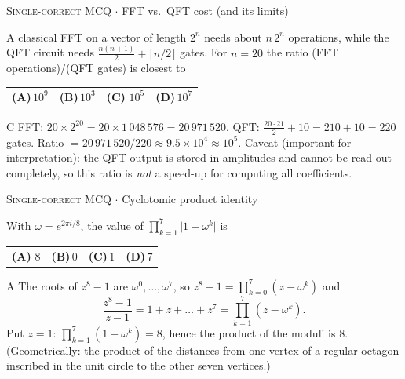 \documentclass[11pt,a4paper]{article}
\newcommand{\optlabel}[1]{\textbf{(#1)}}
\newcommand{\correctlabel}[1]{\textcolor{okgreen}{\textbf{(#1)}\,\ding{51}}}
\newenvironment{qitem}[1]{\begin{list}{}{\setlength{\leftmargin}{3.3em}\setlength{\labelwidth}{3.1em}%
  \setlength{\labelsep}{0.2em}\setlength{\topsep}{3pt}\setlength{\parsep}{3pt}}\item[\textbf{Q.#1}\hfill]}{\end{list}}
\newcommand{\qsep}{\par\vspace{2pt}{\color{black!15}\hrule}\vspace{4pt}}
\newcommand{\qmeta}[2]{{\footnotesize\color{black!60}\textsc{#1} \;$\cdot$\; #2}\par}
\begin{document}
\begin{qitem}{11}
\qmeta{Single-correct MCQ}{FFT vs.\ QFT cost (and its limits)}
A classical FFT on a vector of length $2^n$ needs about $n\,2^n$ operations, while the QFT circuit needs
$\frac{n(n+1)}{2} + \lfloor n/2\rfloor$ gates. For $n = 20$ the ratio (FFT operations)/(QFT gates) is closest to
\par\smallskip\noindent\begin{tabularx}{\linewidth}{@{}*{4}{L}@{}}
\optlabel{A}\,$10^{9}$ & \optlabel{B}\,$10^{3}$ & \correctlabel{C}\,$10^{5}$ & \optlabel{D}\,$10^{7}$
\end{tabularx}
\end{qitem}
\begin{solbox}{C}
FFT: $20 \times 2^{20} = 20 \times 1\,048\,576 = 20\,971\,520$. QFT: $\frac{20\cdot21}{2} + 10 = 210 + 10 = 220$ gates.
Ratio $= 20\,971\,520 / 220 \approx 9.5 \times 10^{4} \approx 10^5$. Caveat (important for interpretation): the QFT output is
stored in amplitudes and cannot be read out completely, so this ratio is \emph{not} a speed-up for computing all coefficients.
\end{solbox}
\qsep

\begin{qitem}{12}
\qmeta{Single-correct MCQ}{Cyclotomic product identity}
With $\omega = e^{2\pi i/8}$, the value of $\displaystyle\prod_{k=1}^{7}\big|1 - \omega^{k}\big|$ is
\par\smallskip\noindent\begin{tabularx}{\linewidth}{@{}*{4}{L}@{}}
\correctlabel{A}\,$8$ & \optlabel{B}\,$0$ & \optlabel{C}\,$1$ & \optlabel{D}\,$7$
\end{tabularx}
\end{qitem}
\begin{solbox}{A}
The roots of $z^8 - 1$ are $\omega^0, \dots, \omega^7$, so $z^8 - 1 = \prod_{k=0}^{7}(z - \omega^k)$ and
\[ \frac{z^8-1}{z-1} = 1 + z + \dots + z^7 = \prod_{k=1}^{7}(z - \omega^k). \]
Put $z = 1$: $\prod_{k=1}^{7}(1-\omega^k) = 8$, hence the product of the moduli is $8$. (Geometrically: the product of the
distances from one vertex of a regular octagon inscribed in the unit circle to the other seven vertices.)
\end{solbox}
\qsep
\end{document}
